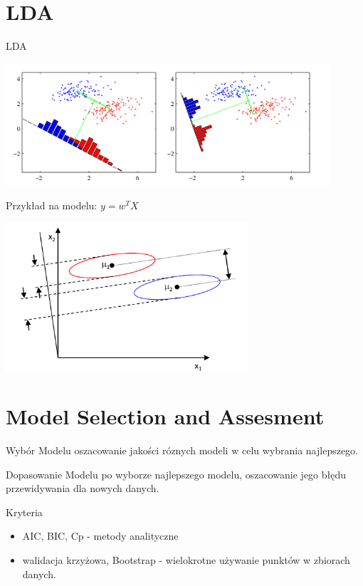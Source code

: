 \documentclass[a4paper]{beamer}
\begin{document}
\section{LDA}
\begin{frame}
\begin{block}{}
LDA
\end{block}
\begin{center}
\includegraphics[width=12cm]{bishop-fig4-6.png}
\end{center}
\begin{block}{Przykład}
na modelu: $y = w^T X$
\end{block}
\end{frame}

\begin{frame}
\begin{center}
\includegraphics[width=9cm]{fiserNieFukushima.png}
\end{center}
\end{frame}

\section{Model Selection and Assesment}
\begin{frame}
\begin{block}{Wybór Modelu}
oszacowanie jakości róznych modeli w celu wybrania najlepszego. 
\end{block}
\begin{block}{Dopasowanie Modelu}
po wyborze najlepszego modelu, oszacowanie jego błędu przewidywania dla nowych danych.
\end{block}
\pause
\begin{block}{Kryteria}
\begin{itemize}
\item AIC, BIC, Cp - metody analityczne
\item walidacja krzyżowa, Bootstrap - wielokrotne używanie punktów w zbiorach danych.
\end{itemize}
\end{block}
\end{frame}
\end{document}
